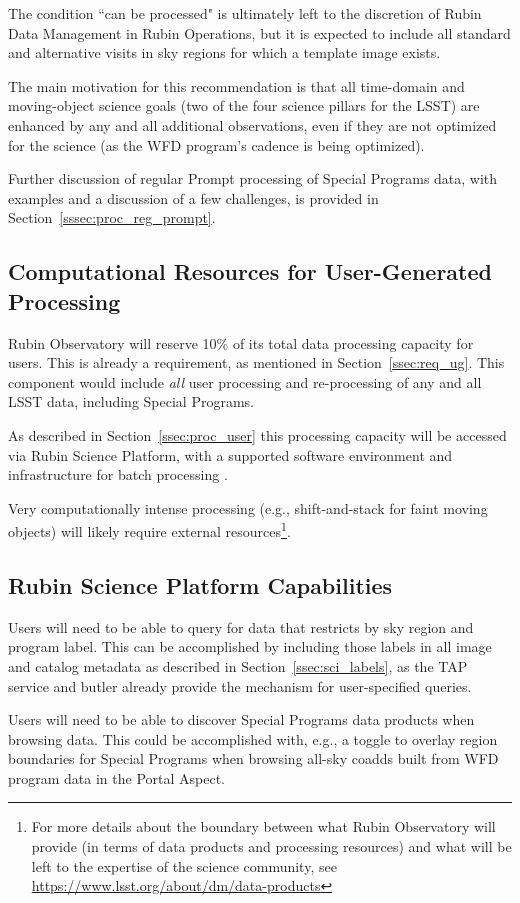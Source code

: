 The condition ``can be processed" is ultimately left to the discretion of
Rubin Data Management in Rubin Operations, but it is expected to include
all standard and alternative visits in sky regions for which a template image exists.

The main motivation for this recommendation is that all time-domain and 
moving-object science goals (two of the four science pillars for the LSST) are
enhanced by any and all additional observations, even if they are not
optimized for the science (as the WFD program's cadence is being optimized).

Further discussion of regular Prompt processing of Special Programs data, with
examples and a discussion of a few challenges,
is provided in Section~\ref{sssec:proc_reg_prompt}.

\subsection{Computational Resources for User-Generated Processing}\label{ssec:sci_comp}

Rubin Observatory will reserve 10\% of its total data processing capacity for users.
This is already a requirement, as mentioned in Section~\ref{ssec:req_ug}.
This component would include {\it all} user processing and re-processing of any and 
all LSST data, including Special Programs. 

As described in Section~\ref{ssec:proc_user} this processing capacity will be 
accessed via Rubin Science Platform, with a supported software environment and 
infrastructure for batch processing .

Very computationally intense processing (e.g., shift-and-stack for faint moving 
objects) will likely require external resources\footnote{For more details about 
the boundary between what Rubin Observatory will provide (in terms of data products 
and processing resources) and what will be left to the expertise of the science community, 
see \url{https://www.lsst.org/about/dm/data-products}}.

\subsection{Rubin Science Platform Capabilities}\label{ssec:sci_rsp}

Users will need to be able to query for data that restricts by sky region and 
program label. 
This can be accomplished by including those labels in all image and catalog 
metadata as described in Section~\ref{ssec:sci_labels}, as the TAP service 
and butler already provide the mechanism for user-specified queries.

Users will need to be able to discover Special Programs data products when 
browsing data.
This could be accomplished with, e.g., a toggle to overlay region boundaries
for Special Programs when browsing all-sky coadds built from WFD program data
in the Portal Aspect.


